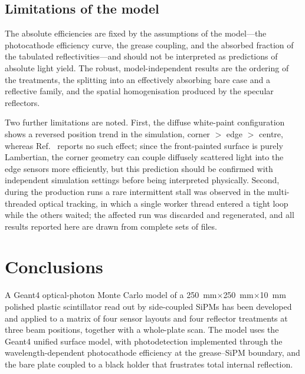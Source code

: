 \documentclass[3p]{elsarticle}
\newcommand{\gfour}{Geant4}
\newcommand{\sipm}{SiPM}
\begin{document}
\subsection{Limitations of the model}
\label{sec:limitations}
The absolute efficiencies are fixed by the assumptions of the model---the
photocathode efficiency curve, the grease coupling, and the absorbed fraction of
the tabulated reflectivities---and should not be interpreted as predictions of
absolute light yield. The robust, model-independent results are the ordering of
the treatments, the splitting into an effectively absorbing bare case and a
reflective family, and the spatial homogenisation produced by the specular
reflectors.

Two further limitations are noted. First, the diffuse white-paint configuration
shows a reversed position trend in the simulation, corner $>$ edge $>$ centre,
whereas Ref.~\cite{Rao2025} reports no such effect; since the
front-painted surface is purely Lambertian, the corner geometry can couple
diffusely scattered light into the edge sensors more efficiently, but this
prediction should be confirmed with independent simulation settings before being
interpreted physically. Second, during the production runs a rare intermittent
stall was observed in the multi-threaded optical tracking, in which a single
worker thread entered a tight loop while the others waited; the affected run was
discarded and regenerated, and all results reported here are drawn from complete
sets of files.

\section{Conclusions}
\label{sec:conclusions}

A \gfour{} optical-photon Monte Carlo model of a
\SI{250}{\milli\meter}$\times$\SI{250}{\milli\meter}$\times$\SI{10}{\milli\meter}
polished plastic scintillator read out by side-coupled \sipm{}s has been
developed and applied to a matrix of four sensor layouts and four reflector
treatments at three beam positions, together with a whole-plate scan. The model
uses the \gfour{} unified surface model, with photodetection implemented through
the wavelength-dependent photocathode efficiency at the grease--\sipm{} boundary,
and the bare plate coupled to a black holder that frustrates total internal
reflection.
\end{document}
